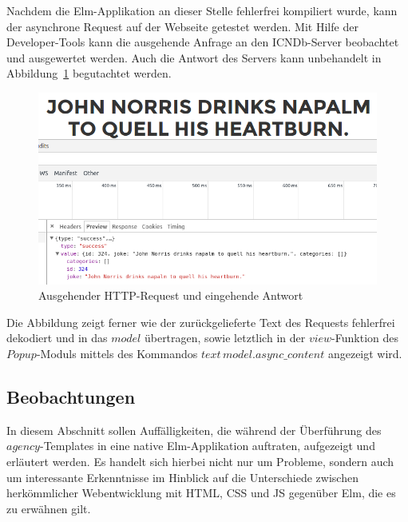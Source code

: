Nachdem die Elm-Applikation an dieser Stelle fehlerfrei kompiliert wurde, kann der asynchrone Request auf der Webseite getestet werden. Mit Hilfe der Developer-Tools kann die ausgehende Anfrage an den \ac{ICNDb}-Server beobachtet und ausgewertet werden. Auch die Antwort des Servers kann unbehandelt in Abbildung~\ref{fig:request-async} begutachtet werden.
\begin{figure}[htb]
\centering
\includegraphics[scale=0.4]{img/request-async.png}
\caption{Ausgehender HTTP-Request und eingehende Antwort}\label{fig:request-async}
\end{figure}
Die Abbildung zeigt ferner wie der zurückgelieferte Text des Requests fehlerfrei dekodiert und in das $model$ übertragen, sowie letztlich in der $view$-Funktion des $Popup$-Moduls mittels des Kommandos $text\,model.async\_content$ angezeigt wird.



\subsection{Beobachtungen}
\label{sec:Beobachtungen}
In diesem Abschnitt sollen Auffälligkeiten, die während der Überführung des $agency$-Templates in eine native Elm-Applikation auftraten, aufgezeigt und erläutert werden. Es handelt sich hierbei nicht nur um Probleme, sondern auch um interessante Erkenntnisse im Hinblick auf die Unterschiede zwischen herkömmlicher Webentwicklung mit \ac{HTML}, \ac{CSS} und \ac{JS} gegenüber Elm, die es zu erwähnen gilt.

